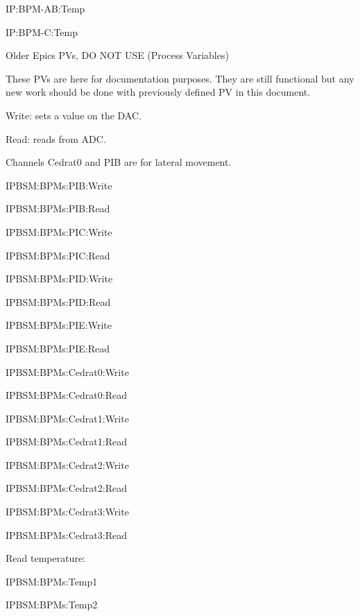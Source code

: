 \documentclass[a4paper,11pt]{book}
\begin{document}
IP:BPM-AB:Temp\par 
IP:BPM-C:Temp\par 

Older Epics PVs, DO NOT USE (Process Variables)\par 
These PVs are here for documentation purposes. They are still functional but any new work should be done with previously defined PV in this document.\par 
Write: sets a value on the DAC.\par 
Read: reads from ADC.\par 
Channels Cedrat0 and PIB are for lateral movement.\par 

IPBSM:BPMs:PIB:Write\par 
IPBSM:BPMs:PIB:Read\par 
IPBSM:BPMs:PIC:Write\par 
IPBSM:BPMs:PIC:Read\par 
IPBSM:BPMs:PID:Write\par 
IPBSM:BPMs:PID:Read\par 
IPBSM:BPMs:PIE:Write\par 
IPBSM:BPMs:PIE:Read\par 


IPBSM:BPMs:Cedrat0:Write\par 
IPBSM:BPMs:Cedrat0:Read\par 
IPBSM:BPMs:Cedrat1:Write\par 
IPBSM:BPMs:Cedrat1:Read\par 
IPBSM:BPMs:Cedrat2:Write\par 
IPBSM:BPMs:Cedrat2:Read\par 
IPBSM:BPMs:Cedrat3:Write\par 
IPBSM:BPMs:Cedrat3:Read\par 

Read temperature:\par 
IPBSM:BPMs:Temp1\par 
IPBSM:BPMs:Temp2\par 
\end{document}
